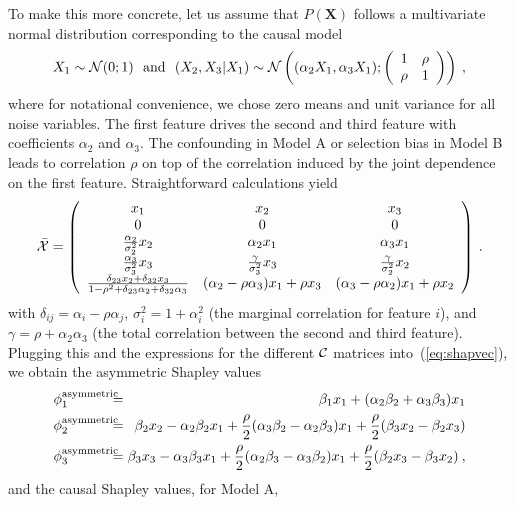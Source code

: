 \documentclass{article}
\newcommand{\vX}{\mathbf{X}}
\newcommand{\contribution}{{\phi}}
\newcommand{\allmeans}{{\cal X}}
\newcommand{\contmat}{{\cal C}}
\newcommand{\boven}[2]{#1^{\mbox{\scriptsize #2}}}
\newcommand{\isequal}{\hspace*{-2.5mm} & = & \hspace*{-2.5mm}}
\begin{document}
To make this more concrete, let us assume that $P(\vX)$ follows a multivariate normal distribution corresponding to the causal model
\[
X_1 \sim {\cal N}(0;1) \mbox{~~and~~} (X_2,X_3|X_1) \sim {\cal N}\left((\alpha_2 X_1, \alpha_3 X_1); \left(\begin{array}{cc} 1 & \rho \\ \rho & 1 \end{array} \right) \right) \: ,
\]
where for notational convenience, we chose zero means and unit variance for all noise variables. The first feature drives the second and third feature with coefficients $\alpha_2$ and $\alpha_3$. The confounding in Model A or selection bias in Model B  leads to correlation $\rho$ on top of the correlation induced by the joint dependence on the first feature. Straightforward calculations yield
\[
\bar{\allmeans} = \left(\begin{array}{ccc}
x_1 & x_2 & x_3 \\
0 & 0 & 0 \\
{\alpha_2 \over \sigma_2^2} x_2 & \alpha_2 x_1 & \alpha_3 x_1 \\
{\alpha_3 \over \sigma_3^2} x_3 & {\gamma \over \sigma_3^2} x_3 & {\gamma \over \sigma_2^2} x_2 \\
{\delta_{23} x_2 + \delta_{32} x_3 \over 1 - \rho^2 + \delta_{23} \alpha_2 + \delta_{32} \alpha_3} & (\alpha_2 - \rho \alpha_3) x_1 + \rho x_3 & (\alpha_3 - \rho \alpha_2) x_1 + \rho x_2
\end{array}\right)
\: .
\]
with $\delta_{ij} = \alpha_i - \rho \alpha_j$, $\sigma_i^2 = 1 + \alpha_i^2$ (the marginal correlation for feature $i$), and $\gamma = \rho + \alpha_2 \alpha_3$ (the total correlation between the second and third feature). Plugging this and the expressions for the different $\contmat$ matrices into~(\ref{eq:shapvec}), we obtain the asymmetric Shapley values
\begin{eqnarray*}
	\boven{\contribution_1}{asymmetric} \isequal \beta_1 x_1 + (\alpha_2 \beta_2 + \alpha_3 \beta_3) x_1  \\
	\boven{\contribution_2}{asymmetric} \isequal \beta_2 x_2 - \alpha_2 \beta_2 x_1 + {\rho \over 2} (\alpha_3 \beta_2 - \alpha_2 \beta_3) x_1 + {\rho \over 2} (\beta_3 x_2 - \beta_2 x_3) \\
	\boven{\contribution_3}{asymmetric} \isequal \beta_3 x_3 - \alpha_3 \beta_3 x_1 + {\rho \over 2} (\alpha_2 \beta_3 - \alpha_3 \beta_2) x_1 + {\rho \over 2}  (\beta_2 x_3 - \beta_3 x_2) \: ,
\end{eqnarray*}
and the causal Shapley values, for Model A,
\end{document}
